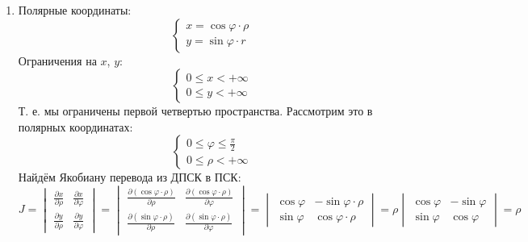\begin{enumerate}
    \item
        Полярные координаты:
        \begin{equation}
            \begin{cases}
                x = \cos\varphi \cdot \rho \\
                y = \sin\varphi \cdot r
            \end{cases}
        \end{equation}
        Ограничения на $x$, $y$:
        \begin{equation}
            \begin{cases}
                0 \leq x < {+\infty} \\
                0 \leq y < {+\infty}
            \end{cases}
        \end{equation}
        Т. е. мы ограничены первой четвертью пространства. Рассмотрим это в полярных координатах: 
        \begin{equation}
            \begin{cases}
                0 \leq \varphi \leq \frac{\pi}{2} \\
                0 \leq \rho < {+\infty}
            \end{cases}
        \end{equation}
        Найдём Якобиану перевода из ДПСК в ПСК:
        $\displaystyle J = \begin{vmatrix}
            \frac{\partial x}{\partial \rho} & \frac{\partial x}{\partial \varphi} \\
            \frac{\partial y}{\partial \rho} & \frac{\partial y}{\partial \varphi}
        \end{vmatrix} =
        \begin{vmatrix}
            \frac{\partial (\cos\varphi \cdot \rho)}{\partial \rho} & \frac{\partial (\cos\varphi \cdot \rho)}{\partial \varphi} \\
            \frac{\partial (\sin\varphi \cdot \rho)}{\partial \rho} & \frac{\partial (\sin\varphi \cdot \rho)}{\partial \varphi}
        \end{vmatrix} =
        \begin{vmatrix}
            \cos\varphi & -\sin\varphi \cdot \rho \\
            \sin\varphi & \cos\varphi \cdot \rho
        \end{vmatrix} =
        \rho \begin{vmatrix}
            \cos\varphi & -\sin\varphi \\
            \sin\varphi & \cos\varphi 
        \end{vmatrix} = \rho$


\end{enumerate}
